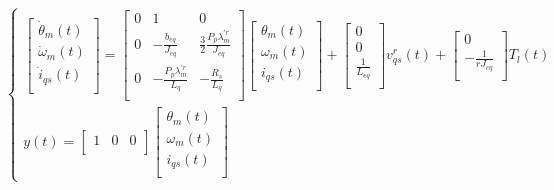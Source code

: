 \documentclass{article}
\begin{document}
\begin{enumerate}[label=\roman*.]
    \begin{equation}
        \begin{cases}
            \begin{bmatrix}
                \dot{\theta}_{m}(t)\\
                \dot{\omega}_{m}(t)\\
                \dot{i}_{qs}(t)\\
            \end{bmatrix} =
            \begin{bmatrix}
                0 & 1 & 0\\
                0 & -\frac{b_{eq}}{J_{eq}} & \frac{3}{2}\frac{P_{p}\lambda_{m}^{\prime r}}{J_{eq}}\\
                0 & -\frac{P_{p}\lambda_{m}^{\prime r}}{L_{q}} & -\frac{R_{s}}{L_{q}}\\
            \end{bmatrix}
            \begin{bmatrix}
                {\theta}_{m}(t)\\
                {\omega}_{m}(t)\\
                {i}_{qs}(t)\\
            \end{bmatrix} +
            \begin{bmatrix}
                0\\
                0\\
                \frac{1}{L_{eq}}\\
            \end{bmatrix} v_{qs}^r(t) +
            \begin{bmatrix}
                0\\
                -\frac{1}{rJ_{eq}}\\
            \end{bmatrix} T_{l}(t)\\
            y(t) =
            \begin{bmatrix}
                1 & 0 & 0\\
            \end{bmatrix}
            \begin{bmatrix}
                {\theta}_{m}(t)\\
                {\omega}_{m}(t)\\
                {i}_{qs}(t)\\
            \end{bmatrix}
        \end{cases}
    \end{equation}


\end{enumerate}
\end{document}
